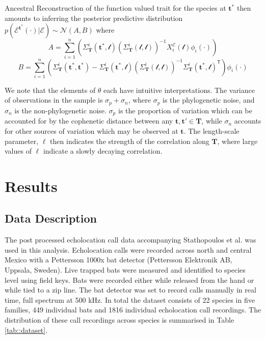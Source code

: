 \documentclass[wsdraft]{ws-rv9x6} %
\begin{document}
Ancestral Reconstruction of the function valued trait for the species at \(\mathbf{t}^*\) then amounts to inferring the posterior predictive distribution \(p(\mathcal{E}^{\mathbf{t}^*} (\cdot) | \mathcal{E}) \sim \mathcal{N}(A, B)\) where 
\begin{equation}
A = \sum_{i=1}^{n} \left( \Sigma_{\mathbf{T}}^i(\mathbf{t}^*, \mathcal{t}) \left( \Sigma_{\mathbf{T}}^i(\mathcal{t}, \mathcal{t})
\right)^{-1} X_i^{\mathcal{E}} (\mathcal{t}) \phi_i(\cdot) \right)
\label{eqn:postmean}
\end{equation}
\begin{equation}
B = \sum_{i=1}^{n}\left( \Sigma_{\mathbf{T}}^i(\mathbf{t}^*, \mathbf{t}^*) -  \Sigma_{\mathbf{T}}^i(\mathbf{t}^*, \mathcal{t}) \left( \Sigma_{\mathbf{T}}^i(\mathcal{t}, \mathcal{t})
\right)^{-1} \Sigma_{\mathbf{T}}^i(\mathbf{t}^*, \mathcal{t})^{\mathsf{T}} \right) \phi_i (\cdot)
\label{eqn:postvar}
\end{equation}

We note that the elements of \(\theta\) each have intuitive interpretations. The variance of observations in the sample is \(\sigma_p + \sigma_n\), where \(\sigma_p\) is the phylogenetic noise, and \(\sigma_n\) is the non-phylogenetic noise. \(\sigma_p\) is the proportion of variation which can be accounted for by the cophenetic distance between any \(\mathbf{t}, \mathbf{t}' \in \mathbf{T}\), while \(\sigma_n\) accounts for other sources of variation which may be observed at \(\mathbf{t}\). The length-scale parameter, \(\ell\) then indicates the strength of the correlation along \(\mathbf{T}\), where large values of \(\ell\) indicate a slowly decaying correlation. 

\section{Results}

\subsection{Data Description}

The post processed echolocation call data accompanying Stathopoulos et al. \cite{stathopoulos2017bat} was used in this analysis. Echolocation calls were recorded across north and central Mexico with a Pettersson 1000x bat detector (Pettersson Elektronik AB, Uppsala, Sweden). Live trapped bats were measured and identified to species level using field keys.\cite{ceballos2005mamiferos} \cite{medellin2sanchez} Bats were recorded either while released from the hand or while tied to a zip line. The bat detector was set to record calls manually in real time, full spectrum at 500 kHz. 
In total the dataset consists of 22 species in five families, 449 individual bats and 1816 individual echolocation call recordings. The distribution of these call recordings across species is summarised in Table \ref{tab::dataset}.
\end{document}
